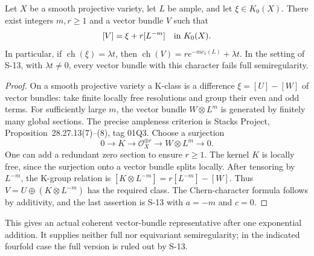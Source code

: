 \begin{proposition}
\label{prop:semireg-kclass-bundle-realization}
Let $X$ be a smooth projective variety, let $L$ be ample, and let
$\xi\in K_0(X)$. There exist integers $m,r\geq1$ and a vector
bundle $V$ such that
\[
 [V]=\xi+r[L^{-m}]\quad\hbox{in }K_0(X).
\]
In particular, if $\operatorname{ch}(\xi)=\lambda t$, then
$\operatorname{ch}(V)=r e^{-m c_1(L)}+\lambda t$.
In the setting of S-13, with $\lambda t\ne0$, every vector bundle
with this character fails full semiregularity.
\end{proposition}
\begin{proof}
On a smooth projective variety a K-class is a difference
$\xi=[U]-[W]$ of vector bundles: take finite locally free
resolutions and group their even and odd terms.
For sufficiently large $m$, the vector bundle $W\otimes L^m$
is generated by finitely many global sections.
The precise ampleness criterion is Stacks Project,
Proposition~28.27.13(7)--(8), tag 01Q3.
Choose a surjection
\[
 0\longrightarrow K\longrightarrow\mathcal O_X^{\oplus r}
   \longrightarrow W\otimes L^m\longrightarrow0 .
\]
One can add a redundant zero section to ensure $r\geq1$.
The kernel $K$ is locally free, since the surjection onto a
vector bundle splits locally. After tensoring by $L^{-m}$,
the K-group relation is
$[K\otimes L^{-m}]=r[L^{-m}]-[W]$.
Thus $V=U\oplus(K\otimes L^{-m})$ has the required class.
The Chern-character formula follows by additivity, and the
last assertion is S-13 with $a=-m$ and $c=0$.
\end{proof}

This gives an actual coherent vector-bundle representative
after one exponential addition. It supplies neither full nor
equivariant semiregularity; in the indicated fourfold case the
full version is ruled out by S-13.
